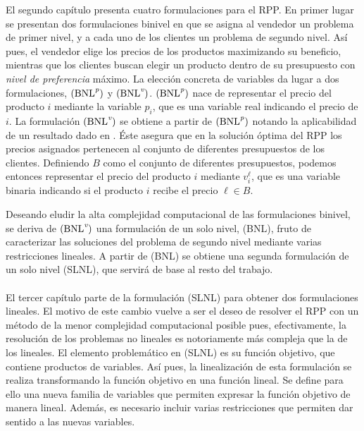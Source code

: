 El segundo capítulo presenta cuatro formulaciones para el RPP. En primer lugar
se presentan dos formulaciones binivel en que se asigna al vendedor un problema
de primer nivel, y a cada uno de los clientes un problema de segundo nivel. Así
pues, el vendedor elige los precios de los productos maximizando su beneficio,
mientras que los clientes buscan elegir un producto dentro de su presupuesto con
\emph{nivel de preferencia} máximo. La elección concreta de variables da lugar a
dos formulaciones, $\rm{(BNL}^{\textit{p}}\rm{)}$ y
$\rm{(BNL}^{\textit{v}}\rm{)}$.  $\rm{(BNL}^{\textit{p}}\rm{)}$ nace de
representar el precio del producto $i$ mediante la variable $p_i$, que es una
variable real indicando el precio de $i$. La formulación
$\rm{(BNL}^{\textit{v}}\rm{)}$ se obtiene a partir de
$\rm{(BNL}^{\textit{p}}\rm{)}$ notando la aplicabilidad de un resultado dado en
\cite{ru:nonparametric}. Éste asegura que en la solución óptima del RPP los
precios asignados pertenecen al conjunto de diferentes presupuestos de los
clientes. Definiendo $B$ como el conjunto de diferentes presupuestos, podemos
entonces representar el precio del producto $i$ mediante $v_i^\ell$, que es una
variable binaria indicando si el producto $i$ recibe el precio $\ell \in B$.

Deseando eludir la alta complejidad computacional de las formulaciones binivel,
se deriva de $\rm{(BNL}^{\textit{v}}\rm{)}$ una formulación de un solo nivel,
(BNL), fruto de caracterizar las soluciones del problema de segundo nivel
mediante varias restricciones lineales. A partir de (BNL) se obtiene una segunda
formulación de un solo nivel (SLNL), que servirá de base al resto del trabajo.

\paragraph*{}

El tercer capítulo parte de la formulación (SLNL) para obtener dos formulaciones
lineales. El motivo de este cambio vuelve a ser el deseo de resolver el RPP con
un método de la menor complejidad computacional posible pues, efectivamente, la
resolución de los problemas no lineales es notoriamente más compleja que la de
los lineales. El elemento problemático en (SLNL) es su función objetivo, que
contiene productos de variables. Así pues, la linealización de esta formulación
se realiza transformando la función objetivo en una función lineal. Se define
para ello una nueva familia de variables que permiten expresar la función
objetivo de manera lineal. Además, es necesario incluir varias restricciones que
permiten dar sentido a las nuevas variables.

